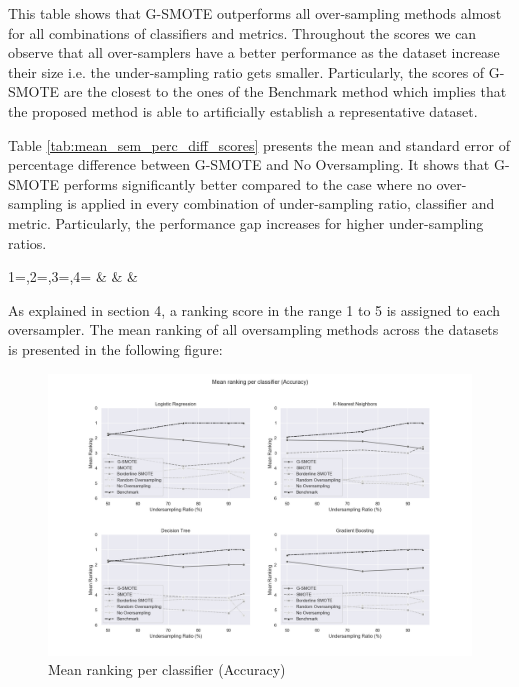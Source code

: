\documentclass[parskip=full]{scrartcl}
\begin{document}
This table shows that G-SMOTE outperforms all over-sampling methods almost for
all combinations of classifiers and metrics. Throughout the scores we can
observe that all over-samplers have a better performance as the dataset increase
their size i.e. the under-sampling ratio gets smaller.  Particularly, the scores
of G-SMOTE are the closest to the ones of the Benchmark method which implies
that the proposed method is able to artificially establish a representative
dataset.

Table \ref{tab:mean_sem_perc_diff_scores} presents the mean and standard error
of percentage difference between G-SMOTE and No Oversampling. It shows that
G-SMOTE performs significantly better compared to the case where no
over-sampling is applied in every combination of under-sampling ratio,
classifier and metric. Particularly, the performance gap increases for higher
under-sampling ratios.

\begin{center}
	\begin{footnotesize}
		{1=\ratio,2=\classifier,3=\metric,4=\difference}
		{\ratio & \classifier & \metric & \difference}
	\end{footnotesize}
	\addtocounter{table}{-1}
	\label{tab:mean_sem_perc_diff_scores}
\end{center}

As explained in section 4, a ranking score in the range 1 to 5 is assigned to
each oversampler. The mean ranking of all oversampling methods across the
datasets is presented in the following figure: 

\begin{figure}[H]
	\includegraphics[width=1\linewidth]
		{../analysis/mean_ranking_per_classifier_accuracy}
	\caption{Mean ranking per classifier (Accuracy)}
	\label{fig:mean_ranking_per_classifier_accuracy}
\end{figure}
\end{document}
